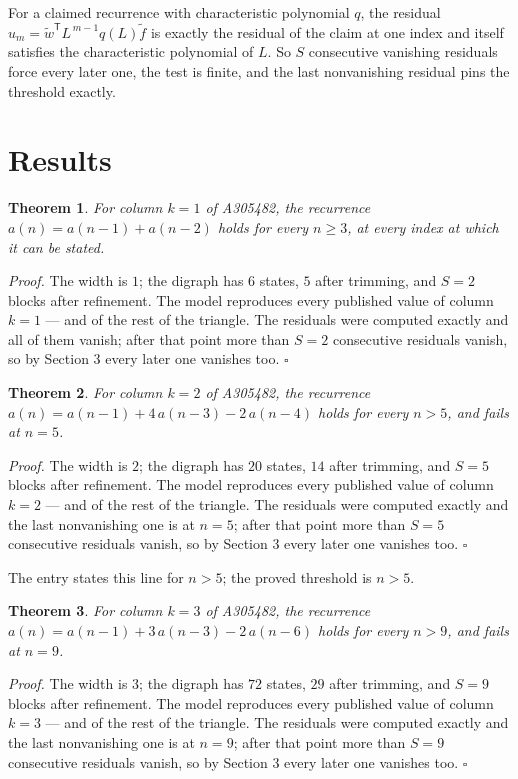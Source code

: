 \documentclass[11pt]{article}
\newtheorem{theorem}{Theorem}
\theoremstyle{definition}
\begin{document}
For a claimed recurrence with characteristic polynomial $q$, the residual $u_m = \tilde w^{\mathsf T}L^{\,m-1}q(L)\tilde f$ is exactly the residual of the claim at one index and itself satisfies the characteristic polynomial of $L$. So $S$ consecutive vanishing residuals force every later one, the test is finite, and the last nonvanishing residual pins the threshold exactly.

\section{Results}

\begin{theorem} For column $k = 1$ of A305482, the recurrence $a(n) = a(n-1) + a(n-2)$ holds for every $n \ge 3$, at every index at which it can be stated.\end{theorem}

{\itshape Proof.} The width is $1$; the digraph has $6$ states, $5$ after trimming, and $S = 2$ blocks after refinement. The model reproduces every published value of column $k = 1$ --- and of the rest of the triangle. The residuals were computed exactly and all of them vanish; after that point more than $S = 2$ consecutive residuals vanish, so by Section 3 every later one vanishes too. $\square$

\begin{theorem} For column $k = 2$ of A305482, the recurrence $a(n) = a(n-1) + 4\,a(n-3) - 2\,a(n-4)$ holds for every $n > 5$, and fails at $n = 5$.\end{theorem}

{\itshape Proof.} The width is $2$; the digraph has $20$ states, $14$ after trimming, and $S = 5$ blocks after refinement. The model reproduces every published value of column $k = 2$ --- and of the rest of the triangle. The residuals were computed exactly and the last nonvanishing one is at $n = 5$; after that point more than $S = 5$ consecutive residuals vanish, so by Section 3 every later one vanishes too. $\square$

The entry states this line for $n > 5$; the proved threshold is $n > 5$.

\begin{theorem} For column $k = 3$ of A305482, the recurrence $a(n) = a(n-1) + 3\,a(n-3) - 2\,a(n-6)$ holds for every $n > 9$, and fails at $n = 9$.\end{theorem}

{\itshape Proof.} The width is $3$; the digraph has $72$ states, $29$ after trimming, and $S = 9$ blocks after refinement. The model reproduces every published value of column $k = 3$ --- and of the rest of the triangle. The residuals were computed exactly and the last nonvanishing one is at $n = 9$; after that point more than $S = 9$ consecutive residuals vanish, so by Section 3 every later one vanishes too. $\square$
\end{document}
